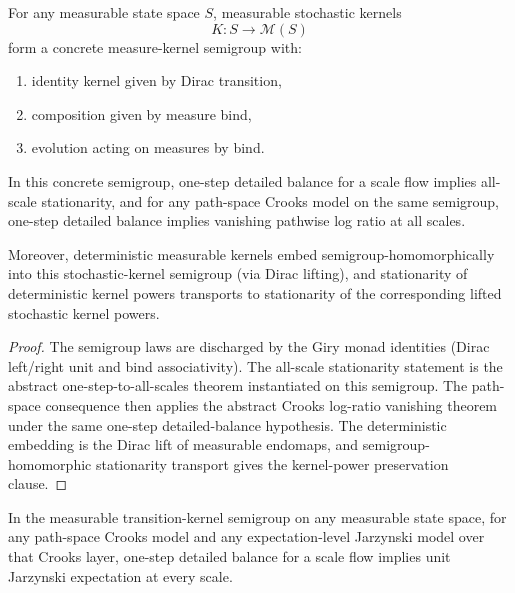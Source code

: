 \begin{theorem}\label{thm:measurable-transition-kernel-concrete-endpoint}
For any measurable state space $S$, measurable stochastic kernels
\[
K:S\to \mathcal M(S)
\]
form a concrete measure-kernel semigroup with:
\begin{enumerate}
\item identity kernel given by Dirac transition,
\item composition given by measure bind,
\item evolution acting on measures by bind.
\end{enumerate}
In this concrete semigroup, one-step detailed balance for a scale flow implies all-scale stationarity, and for any path-space Crooks model on the same semigroup, one-step detailed balance implies vanishing pathwise log ratio at all scales.

Moreover, deterministic measurable kernels embed semigroup-homomorphically into this stochastic-kernel semigroup (via Dirac lifting), and stationarity of deterministic kernel powers transports to stationarity of the corresponding lifted stochastic kernel powers.
\end{theorem}

\begin{proof}
The semigroup laws are discharged by the Giry monad identities (Dirac left/right unit and bind associativity). The all-scale stationarity statement is the abstract one-step-to-all-scales theorem instantiated on this semigroup. The path-space consequence then applies the abstract Crooks log-ratio vanishing theorem under the same one-step detailed-balance hypothesis. The deterministic embedding is the Dirac lift of measurable endomaps, and semigroup-homomorphic stationarity transport gives the kernel-power preservation clause.
\end{proof}

\begin{corollary}\label{thm:measurable-transition-jarzynski-concrete-endpoint}
In the measurable transition-kernel semigroup on any measurable state space, for any path-space Crooks model and any expectation-level Jarzynski model over that Crooks layer, one-step detailed balance for a scale flow implies unit Jarzynski expectation at every scale.
\end{corollary}

